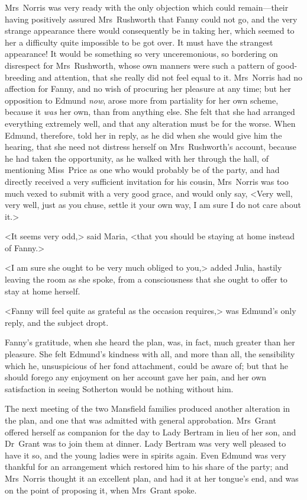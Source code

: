 Mrs~Norris was very ready with the only objection which could remain—their having positively assured Mrs~Rushworth that Fanny could not go, and the very strange appearance there would consequently be in taking her, which seemed to her a difficulty quite impossible to be got over. It must have the strangest appearance! It would be something so very unceremonious, so bordering on disrespect for Mrs~Rushworth, whose own manners were such a pattern of good-breeding and attention, that she really did not feel equal to it. Mrs~Norris had no affection for Fanny, and no wish of procuring her pleasure at any time; but her opposition to Edmund \textit{now}, arose more from partiality for her own scheme, because it \textit{was}  her own, than from anything else. She felt that she had arranged everything extremely well, and that any alteration must be for the worse. When Edmund, therefore, told her in reply, as he did when she would give him the hearing, that she need not distress herself on Mrs~Rushworth's account, because he had taken the opportunity, as he walked with her through the hall, of mentioning Miss~Price as one who would probably be of the party, and had directly received a very sufficient invitation for his cousin, Mrs~Norris was too much vexed to submit with a very good grace, and would only say, <Very well, very well, just as you chuse, settle it your own way, I am sure I do not care about it.>

<It seems very odd,> said Maria, <that you should be staying at home instead of Fanny.>

<I am sure she ought to be very much obliged to you,> added Julia, hastily leaving the room as she spoke, from a consciousness that she ought to offer to stay at home herself.

<Fanny will feel quite as grateful as the occasion requires,> was Edmund's only reply, and the subject dropt.

Fanny's gratitude, when she heard the plan, was, in fact, much greater than her pleasure. She felt Edmund's kindness with all, and more than all, the sensibility which he, unsuspicious of her fond attachment, could be aware of; but that he should forego any enjoyment on her account gave her pain, and her own satisfaction in seeing Sotherton would be nothing without him.

The next meeting of the two Mansfield families produced another alteration in the plan, and one that was admitted with general approbation. Mrs~Grant offered herself as companion for the day to Lady Bertram in lieu of her son, and Dr~Grant was to join them at dinner. Lady Bertram was very well pleased to have it so, and the young ladies were in spirits again. Even Edmund was very thankful for an arrangement which restored him to his share of the party; and Mrs~Norris thought it an excellent plan, and had it at her tongue's end, and was on the point of proposing it, when Mrs~Grant spoke.

